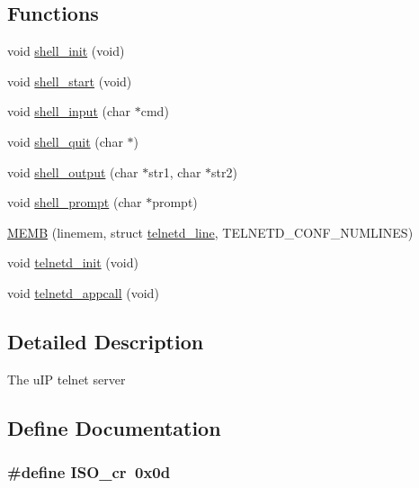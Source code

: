 \subsection*{Functions}
\begin{DoxyCompactItemize}
\item 
void \hyperlink{group__telnetd_ga69b075ef7e4d7bcf5a903d3d75baac02}{shell\_\-init} (void)
\item 
void \hyperlink{group__telnetd_gad1f18f739da7703628c3663209463a0d}{shell\_\-start} (void)
\item 
void \hyperlink{group__telnetd_ga812befed47ea952b711bc490c8d11eee}{shell\_\-input} (char $\ast$cmd)
\item 
void \hyperlink{group__telnetd_ga984c4a8b65a3cb35460b073a40568c25}{shell\_\-quit} (char $\ast$)
\item 
void \hyperlink{group__telnetd_gaf11c966b0e4f4ecaa73deb14bfb6830f}{shell\_\-output} (char $\ast$str1, char $\ast$str2)
\item 
void \hyperlink{group__telnetd_ga123c95a7bb55143cabba92446ce8f513}{shell\_\-prompt} (char $\ast$prompt)
\item 
\hyperlink{group__telnetd_ga8505bcbff8774c99458a328d8d2e9bc0}{MEMB} (linemem, struct \hyperlink{structtelnetd__line}{telnetd\_\-line}, TELNETD\_\-CONF\_\-NUMLINES)
\item 
void \hyperlink{group__telnetd_ga82ff99d50221f7c17df57dc6092ffc97}{telnetd\_\-init} (void)
\item 
void \hyperlink{group__telnetd_ga52c3c5ab1b1aa0659b5e465f7fbcc409}{telnetd\_\-appcall} (void)
\end{DoxyCompactItemize}


\subsection{Detailed Description}
The uIP telnet server 

\subsection{Define Documentation}
\hypertarget{group__telnetd_ga6cda47c85ce1b58b501b44ac9cccc50e}{
\subsubsection[{ISO\_\-cr}]{\setlength{\rightskip}{0pt plus 5cm}\#define ISO\_\-cr~0x0d}}
\label{group__telnetd_ga6cda47c85ce1b58b501b44ac9cccc50e}


